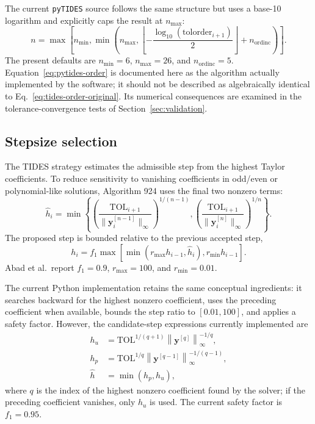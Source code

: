 \documentclass[11pt]{article}
\begin{document}
The current \texttt{pyTIDES} source follows the same structure but uses a
base-10 logarithm and explicitly caps the result at $n_{\max}$:
\begin{equation}
    n
    =
    \max\left[
        n_{\min},
        \min\left(
            n_{\max},
            \left\lfloor
                -\frac{\log_{10}(\mathrm{tolorder}_{i+1})}{2}
            \right\rfloor+n_{\mathrm{ordinc}}
        \right)
    \right].
    \label{eq:pytides-order}
\end{equation}
The present defaults are $n_{\min}=6$, $n_{\max}=26$, and
$n_{\mathrm{ordinc}}=5$. Equation~\eqref{eq:pytides-order} is documented
here as the algorithm actually implemented by the software; it should not be
described as algebraically identical to Eq.~\eqref{eq:tides-order-original}.
Its numerical consequences are examined in the tolerance-convergence tests
of Section~\ref{sec:validation}.

\subsection{Stepsize selection}

The TIDES strategy estimates the admissible step from the highest Taylor
coefficients. To reduce sensitivity to vanishing coefficients in odd/even or
polynomial-like solutions, Algorithm 924 uses the final two nonzero terms:
\begin{equation}
    \widehat h_i
    =
    \min\left\{
        \left(
            \frac{\mathrm{TOL}_{i+1}}
                 {\|\bm y_i^{[n-1]}\|_\infty}
        \right)^{1/(n-1)},
        \left(
            \frac{\mathrm{TOL}_{i+1}}
                 {\|\bm y_i^{[n]}\|_\infty}
        \right)^{1/n}
    \right\}.
    \label{eq:tides-step-original}
\end{equation}
The proposed step is bounded relative to the previous accepted step,
\begin{equation}
    h_i
    =
    f_1
    \max\left[
        \min(r_{\max}h_{i-1},\widehat h_i),
        r_{\min}h_{i-1}
    \right].
    \label{eq:tides-step-bounds}
\end{equation}
Abad et al.\ report $f_1=0.9$, $r_{\max}=100$, and $r_{\min}=0.01$.

The current Python implementation retains the same conceptual ingredients:
it searches backward for the highest nonzero coefficient, uses the preceding
coefficient when available, bounds the step ratio to $[0.01,100]$, and
applies a safety factor. However, the candidate-step expressions currently
implemented are
\begin{align}
    h_u &=
    \mathrm{TOL}^{1/(q+1)}
    \left\|\bm y^{[q]}\right\|_\infty^{-1/q},
    \label{eq:pytides-hu}\\
    h_p &=
    \mathrm{TOL}^{1/q}
    \left\|\bm y^{[q-1]}\right\|_\infty^{-1/(q-1)},
    \label{eq:pytides-hp}\\
    \widehat h &= \min(h_p,h_u),
    \label{eq:pytides-step}
\end{align}
where $q$ is the index of the highest nonzero coefficient found by the
solver; if the preceding coefficient vanishes, only $h_u$ is used. The
current safety factor is $f_1=0.95$.
\end{document}

